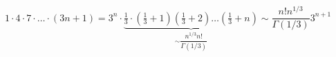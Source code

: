 \begin{example}
	$1\cdot 4 \cdot 7 \cdot \ldots \cdot (3n+1) = 3^n \cdot \underbrace{ \frac{1}{3}\cdot \left(\frac{1}{3} + 1 \right) \left(\frac{1}{3} + 2 \right) \ldots \left(\frac{1}{3} + n \right)}_{\sim \dfrac{n^{1/3}n!}{\Gamma(1/3)}} \sim \dfrac{n! n^{1/3}}{\Gamma(1/3)}3^{n+1}$
\end{example}

